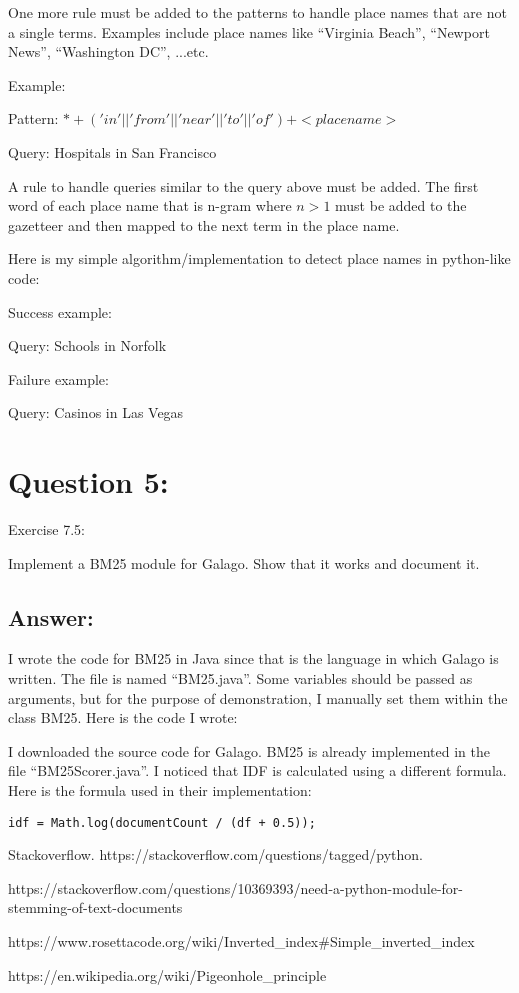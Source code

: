 \documentclass[a4paper, 11pt]{article}
\begin{document}
One more rule must be added to the patterns to handle place names that are not a single terms. Examples include place names like ``Virginia Beach'', ``Newport News'', ``Washington DC'', ...etc.

Example:

Pattern: $* + ('in' || 'from' || 'near' || 'to' || 'of' ) + <place name>$

Query: Hospitals in San Francisco

A rule to handle queries similar to the query above must be added. The first word of each place name that is n-gram where $n > 1$ must be added to the gazetteer and then mapped to the next term in the place name.

Here is my simple algorithm/implementation to detect place names in python-like code:


Success example:

Query: Schools in Norfolk

Failure example:

Query: Casinos in Las Vegas

\section*{Question 5:}
Exercise 7.5: 

Implement a BM25 module for Galago. Show that it works and document
it.

\subsection*{Answer:}

I wrote the code for BM25 in Java since that is the language in which Galago is written. The file is named ``BM25.java''. Some variables should be passed as arguments, but for the purpose of demonstration, I manually set them within the class BM25. Here is the code I wrote:



I downloaded the source code for Galago. BM25 is already implemented in the file ``BM25Scorer.java''. I noticed that IDF is calculated using a different formula. Here is the formula used in their implementation:

\begin{lstlisting}
idf = Math.log(documentCount / (df + 0.5)); 
\end{lstlisting}




\begin{thebibliography}{9}

\bibitem{} 
Stackoverflow. https://stackoverflow.com/questions/tagged/python.

\bibitem{} 
https://stackoverflow.com/questions/10369393/need-a-python-module-for-stemming-of-text-documents

\bibitem{}
https://www.rosettacode.org/wiki/Inverted\_index\#Simple\_inverted\_index

\bibitem{}
https://en.wikipedia.org/wiki/Pigeonhole\_principle


\end{thebibliography}
\end{document}

